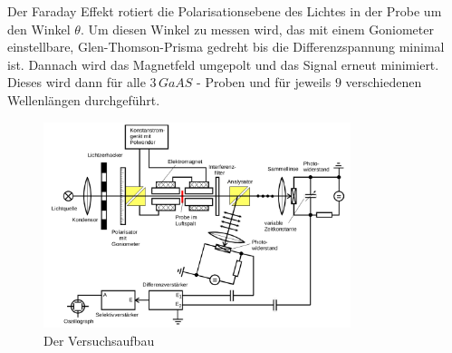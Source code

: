 Der Faraday Effekt rotiert die Polarisationsebene des Lichtes in der Probe um
den Winkel $\theta$. Um diesen Winkel zu messen wird, das mit einem Goniometer
einstellbare, Glen-Thomson-Prisma gedreht bis die Differenzspannung minimal
ist. Dannach wird das Magnetfeld umgepolt und das Signal erneut minimiert.
Dieses wird dann für alle $3 \, GaAS$ - Proben und für jeweils $9$
verschiedenen Wellenlängen durchgeführt.

\begin{figure}
	\centering
	\includegraphics[width=0.8\textwidth]{./Bilder/aufbau.png}
	\caption{Der Versuchsaufbau \cite{man}}\label{fig:aufbau}
\end{figure}

